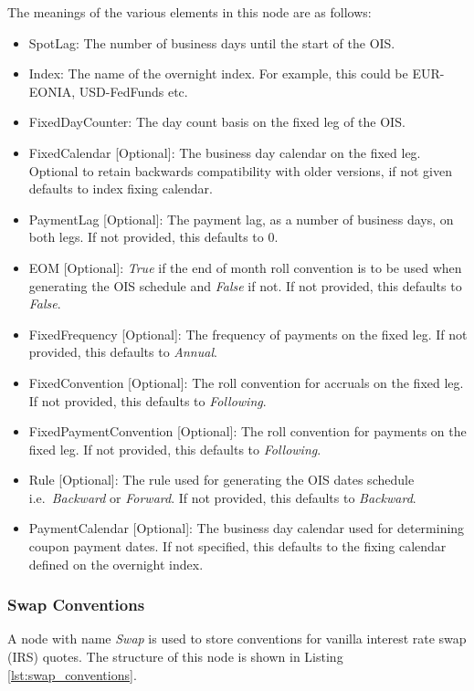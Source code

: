 The meanings of the various elements in this node are as follows:
\begin{itemize}
\item SpotLag: The number of business days until the start of the OIS.
\item Index: The name of the overnight index. For example, this could be EUR-EONIA, USD-FedFunds etc.
\item FixedDayCounter: The day count basis on the fixed leg of the OIS.
\item FixedCalendar [Optional]: The business day calendar on the fixed leg. Optional to retain backwards compatibility
  with older versions, if not given defaults to index fixing calendar.
\item PaymentLag [Optional]: The payment lag, as a number of business days, on both legs. If not provided, this defaults
to 0.
\item EOM [Optional]: \emph{True} if the end of month roll convention is to be used when generating the OIS schedule and
\emph{False} if not. If not provided, this defaults to \emph{False}.
\item FixedFrequency [Optional]: The frequency of payments on the fixed leg. If not provided, this defaults to
\emph{Annual}.
\item FixedConvention [Optional]: The roll convention for accruals on the fixed leg. If not provided, this defaults to
\emph{Following}.
\item FixedPaymentConvention [Optional]: The roll convention for payments on the fixed leg. If not provided, this
defaults to \emph{Following}.
\item Rule [Optional]: The rule used for generating the OIS dates schedule i.e.\ \emph{Backward} or \emph{Forward}. If
not provided, this defaults to \emph{Backward}.
\item PaymentCalendar [Optional]: The business day calendar used for determining coupon payment dates.
If not specified, this defaults to the fixing calendar defined on the overnight index.
\end{itemize}

\subsubsection{Swap Conventions}
A node with name \emph{Swap} is used to store conventions for vanilla interest rate swap (IRS) quotes. The structure of
this node is shown in Listing \ref{lst:swap_conventions}.

